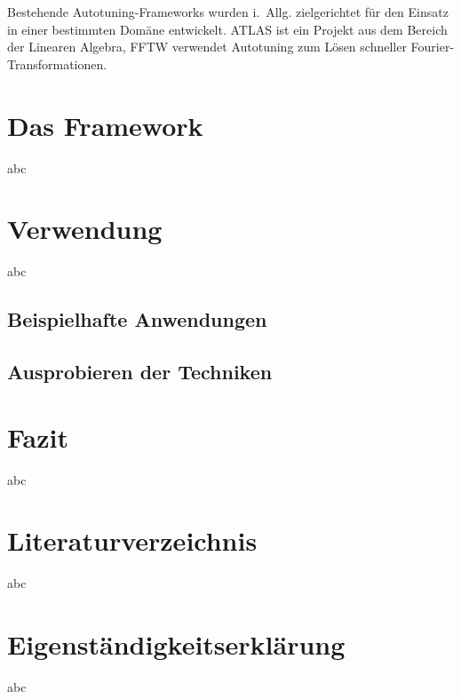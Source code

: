 \documentclass[a4paper,11pt]{scrartcl}
\begin{document}

\noindent
Bestehende Autotuning-Frameworks wurden i.~Allg. zielgerichtet für den Einsatz in einer 
bestimmten Domäne entwickelt. \textsc{ATLAS} ist ein Projekt aus dem Bereich der Linearen Algebra,
\textsc{FFTW} verwendet Autotuning zum Lösen schneller Fourier-Transformationen.



\section{Das Framework}
abc

\section{Verwendung}
abc
\subsection{Beispielhafte Anwendungen}

\subsection{Ausprobieren der Techniken}

\section{Fazit}
abc

\section{Literaturverzeichnis}
abc

\section{Eigenständigkeitserklärung}
abc
\end{document}
